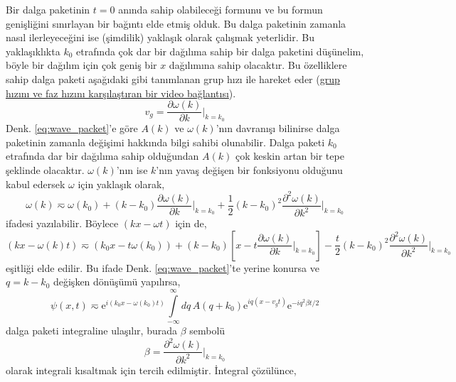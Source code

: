 \documentclass[a4paper,12pt, twoside]{article}
\begin{document}
Bir dalga paketinin $t=0$ anında sahip olabileceği formunu ve bu formun genişliğini sınırlayan bir bağıntı elde etmiş olduk. Bu dalga paketinin zamanla nasıl ilerleyeceğini ise (şimdilik) yaklaşık olarak çalışmak yeterlidir. Bu yaklaşıklıkta $k_0$ etrafında çok dar bir dağılıma sahip bir dalga paketini düşünelim, böyle bir dağılım için çok geniş bir $x$ dağılımına sahip olacaktır. Bu özelliklere sahip dalga paketi aşağıdaki gibi tanımlanan grup hızı ile hareket eder (\href{https://www.youtube.com/watch?annotation_id=annotation_1566711117&feature=iv&src_vid=MMV2Zt7x430&v=v9DPzMoWpc0
}{grup hızını ve faz hızını karşılaştıran bir video bağlantısı}).
\begin{equation}
v_g = \frac{\partial \omega(k)}{\partial k} \bigg |_{k=k_0}
\label{eq:group_velocity}
\end{equation}
Denk. \ref{eq:wave_packet}'e göre $A(k)$ ve $\omega(k)$'nın davranışı bilinirse dalga paketinin zamanla değişimi hakkında bilgi sahibi olunabilir. Dalga paketi $k_0$ etrafında dar bir dağılıma sahip olduğundan $A(k)$ çok keskin artan bir tepe şeklinde olacaktır. $\omega(k)$'nın ise $k$'nın yavaş değişen bir fonksiyonu olduğunu kabul edersek $\omega$ için yaklaşık olarak,
\begin{equation}
\omega(k) \eqsim \omega(k_0) +  (k-k_0) \frac{\partial \omega(k)}{\partial k} \bigg |_{k=k_0} + \frac{1}{2}(k-k_0)^2 \frac{\partial^2 \omega(k)}{\partial k^2} \bigg |_{k=k_0}  
\end{equation}
ifadesi yazılabilir. Böylece $(kx-\omega t)$ için de,
\begin{equation*}
(kx - \omega(k)t) \eqsim (k_0 x - t \omega(k_0)) +  (k-k_0)\left[x - t\frac{\partial \omega(k)}{\partial k} \bigg |_{k=k_0} \right] - \frac{t}{2}(k-k_0)^2 \frac{\partial^2 \omega(k)}{\partial k^2} \bigg |_{k=k_0}  
\end{equation*}
eşitliği elde edilir. Bu ifade Denk. \ref{eq:wave_packet}'te yerine konursa ve $q=k-k_0$ değişken dönüşümü yapılırsa,
\begin{equation}
\psi(x, t) \eqsim  \text{e}^{i(k_0x - \omega(k_0) t)}  \int\limits_{-\infty}^{\infty}dq\,A(q + k_0) \text{e}^{iq(x - v_g t)} \text{e}^{-iq^2\beta t/2} 
\label{eq:wave_packet_t_change}
\end{equation}
dalga paketi integraline ulaşılır, burada $\beta$ sembolü
\begin{equation*}
\beta = \frac{\partial^2 \omega(k)}{\partial k^2}\bigg |_{k=k_0}
\end{equation*}
olarak integrali kısaltmak için tercih edilmiştir. İntegral çözülünce,
\end{document}
